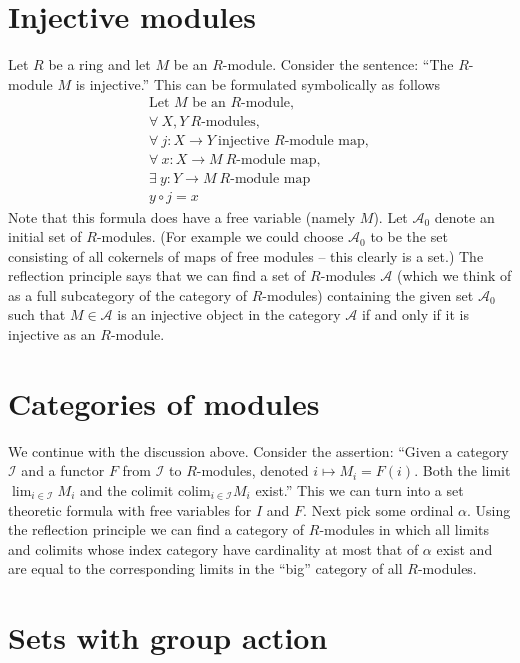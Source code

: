 \section{Injective modules}
\label{section-injective-modules}

\noindent
Let $R$ be a ring and let $M$ be an $R$-module.
Consider the sentence: ``The $R$-module $M$ is injective.''
This can be formulated symbolically as follows
\begin{eqnarray*}
\text{Let }M \text{ be an $R$-module},\\
\forall\ X,Y\ \text{$R$-modules},\\
\forall\ j : X\to Y\ \text{injective $R$-module map},\\
\forall\ x : X\to M\ \text{$R$-module map},\\
\exists\ y : Y\to M\ \text{$R$-module map}\\
y \circ j = x
\end{eqnarray*}
Note that this formula does have a free variable (namely $M$).
Let $\mathcal{A}_0$ denote an initial set of $R$-modules.
(For example we could choose $\mathcal{A}_0$ to be the set
consisting of all cokernels of maps of free modules -- this
clearly is a set.)
The reflection principle says that we can find a set
of $R$-modules $\mathcal{A}$ (which we think of as a full subcategory
of the category of $R$-modules) containing the given set $\mathcal{A}_0$
such that $M \in \mathcal{A}$ is an injective
object in the category $\mathcal{A}$ if and only if
it is injective as an $R$-module. 

\section{Categories of modules}
\label{section-categories-modules}

\noindent
We continue with the discussion above.
Consider the assertion: ``Given a category $\mathcal{I}$
and a functor $F$ from $\mathcal{I}$ to $R$-modules,
denoted $i \mapsto M_i = F(i)$. Both the limit $\lim_{i\in \mathcal{I}} M_i$
and the colimit $\text{colim}_{i \in \mathcal{I}} M_i$ exist.'' 
This we can turn into a set theoretic formula with free
variables for $I$ and $F$. Next pick some ordinal $\alpha$.
Using the reflection principle
we can find a category of $R$-modules
in which all limits and colimits whose index category 
have cardinality at most that of $\alpha$ exist and
are equal to the corresponding limits in the ``big''
category of all $R$-modules.

\section{Sets with group action}
\label{section-sets-with-group-action}

